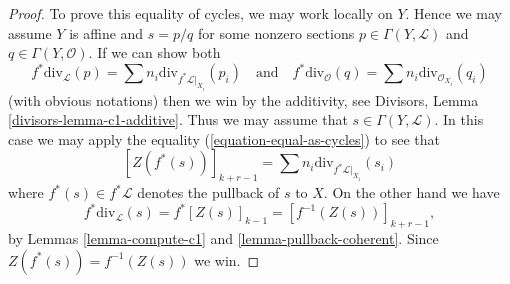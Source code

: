 \documentclass[10pt,a4paper]{amsart}
\theoremstyle{plain}
\theoremstyle{definition}
\theoremstyle{remark}
\numberwithin{equation}{subsection}
\begin{document}
\begin{proof}
To prove this equality of cycles, we may work locally on $Y$.
Hence we may assume $Y$ is affine and $s = p/q$ for some nonzero
sections $p \in \Gamma(Y, \mathcal{L})$ and $q \in \Gamma(Y, \mathcal{O})$.
If we can show both
$$
f^*\text{div}_\mathcal{L}(p) =
\sum n_i\text{div}_{f^*\mathcal{L}|_{X_i}}(p_i)
\quad\text{and}\quad
f^*\text{div}_\mathcal{O}(q) =
\sum n_i\text{div}_{\mathcal{O}_{X_i}}(q_i)
$$
(with obvious notations) then we win by the
additivity, see Divisors, Lemma \ref{divisors-lemma-c1-additive}.
Thus we may assume that $s \in \Gamma(Y, \mathcal{L})$.
In this case we may apply the equality
(\ref{equation-equal-as-cycles}) to see that
$$
[Z(f^*(s))]_{k + r - 1} =
\sum n_i\text{div}_{f^*\mathcal{L}|_{X_i}}(s_i)
$$
where $f^*(s) \in f^*\mathcal{L}$ denotes the pullback of $s$ to $X$.
On the other hand we have
$$
f^*\text{div}_\mathcal{L}(s) = f^*[Z(s)]_{k - 1}
= [f^{-1}(Z(s))]_{k + r - 1},
$$
by Lemmas \ref{lemma-compute-c1} and \ref{lemma-pullback-coherent}.
Since $Z(f^*(s)) = f^{-1}(Z(s))$ we win.
\end{proof}
\end{document}
